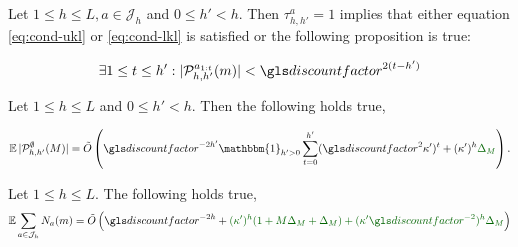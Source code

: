 \begin{lemma}
	\label{lemma:size_Ph}
	\begin{leftbar}[lemmabar]
	Let $1 \leq h \leq L,  a\in \mathcal{J}_h$ and $0\leq h'<h$. Then $\tau^a_{h,h'}=1$ implies that either equation \eqref{eq:cond-ukl} or \eqref{eq:cond-lkl} is satisfied or the following proposition is true:
	
	
	\begin{equation}
	\label{eq:P-min-size}
	\exists 1\leq t \leq h': |\mathcal{P}_{h,h'}^{a_{1:t}}(m)| < \discount^{2(t-h')}
	\end{equation}
	\end{leftbar}
\end{lemma}

\begin{lemma}
	\label{lemma:expected-P-size}
    \begin{leftbar}[lemmabar]
	Let $1\leq h\leq L$ and $0 \leq h' < h$. Then the following holds true,
	
	\begin{equation*}
	\expectedvalue |\mathcal{P}^\emptyset_{h,h'}(M)| = \tilde{O}\left(\discount^{-2h'}\mathbbm{1}_{h'>0}\sum_{t=0}^{h'}(\discount^2 \kappa')^t + (\kappa')^h\diff{\Delta_M} \right).
	\end{equation*}
	\end{leftbar}
\end{lemma}

\begin{lemma}
	\label{lemma:expected-plays-count}
	\begin{leftbar}[lemmabar]
	Let $1\leq h\leq L$. The following holds true,
	\begin{equation*}
	\expectedvalue \sum_{a\in \mathcal{J}_h} N_a(m) = \tilde{O}\left(\discount^{-2h} + \diff{(\kappa')^h(1+M\Delta_M+\Delta_M) + (\kappa'\discount^{-2})^h\Delta_M}\right)
	\end{equation*}
	\end{leftbar}
\end{lemma}

